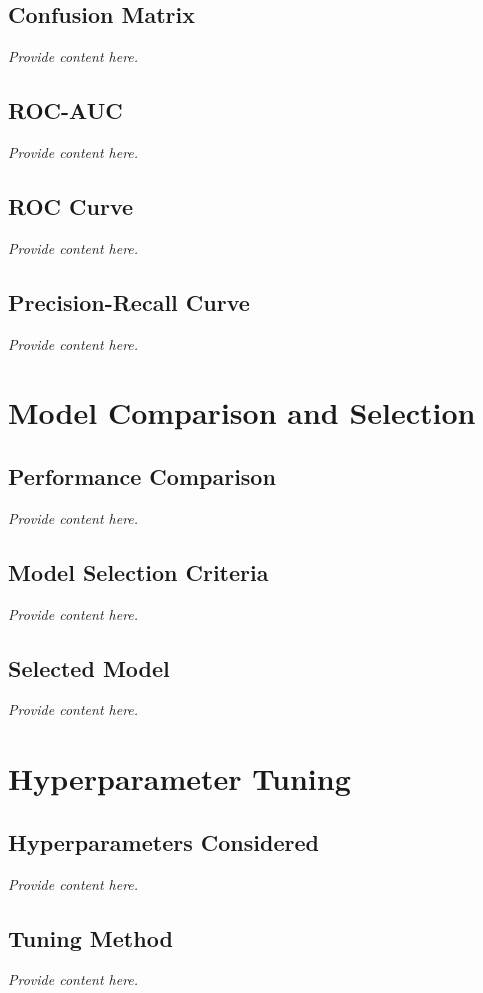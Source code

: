 \documentclass[12pt, a4paper]{article}
\begin{document}
\subsection{Confusion Matrix}
\textit{Provide content here.}

\subsection{ROC-AUC}
\textit{Provide content here.}

\subsection{ROC Curve}
\textit{Provide content here.}

\subsection{Precision-Recall Curve}
\textit{Provide content here.}

\section{Model Comparison and Selection}
\subsection{Performance Comparison}
\textit{Provide content here.}

\subsection{Model Selection Criteria}
\textit{Provide content here.}

\subsection{Selected Model}
\textit{Provide content here.}

\section{Hyperparameter Tuning}
\subsection{Hyperparameters Considered}
\textit{Provide content here.}

\subsection{Tuning Method}
\textit{Provide content here.}
\end{document}
